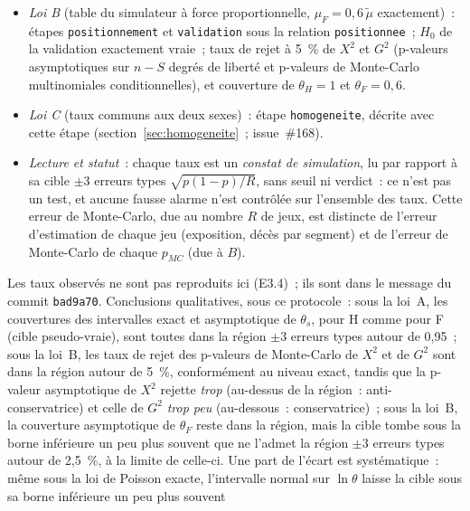 \documentclass[a4paper,11pt]{article}
\newcommand{\code}[1]{\texttt{\small #1}}
\begin{document}
\begin{itemize}[leftmargin=*, itemsep=2pt]
    modèle (la force vraie $-\ln(1 - 0{,}6\,\tilde q)$ n'est pas
    proportionnelle à $\tilde\mu$)~: la cible est la valeur
    \emph{pseudo-vraie} $\sum E^c \mu_F / \sum E^c \tilde\mu$, calculée sur
    l'exposition centrale des cellules retenues de chaque jeu.
  \item \emph{Loi B} (table du simulateur à force proportionnelle, $\mu_F =
    0{,}6\,\tilde\mu$ exactement)~: étapes \code{positionnement} et
    \code{validation} sous la relation \code{positionnee}~; $H_0$ de la
    validation exactement vraie~; taux de rejet à 5~\% de $X^2$ et $G^2$
    (p-valeurs asymptotiques sur $n - S$ degrés de liberté et p-valeurs de
    Monte-Carlo multinomiales conditionnelles), et couverture de $\theta_H
    = 1$ et $\theta_F = 0{,}6$.
  \item \emph{Loi C} (taux communs aux deux sexes)~: étape
    \code{homogeneite}, décrite avec cette étape (section~\ref{sec:homogeneite}~;
    issue~\#168).
  \item \emph{Lecture et statut}~: chaque taux est un \emph{constat de
    simulation}, lu par rapport à sa cible $\pm 3$ erreurs types
    $\sqrt{p(1 - p)/R}$, sans seuil ni verdict~: ce n'est pas un test, et
    aucune fausse alarme n'est contrôlée sur l'ensemble des taux. Cette
    erreur de Monte-Carlo, due au nombre $R$ de jeux, est distincte de
    l'erreur d'estimation de chaque jeu (exposition, décès par segment)
    et de l'erreur de Monte-Carlo de chaque $p_{MC}$ (due à $B$).
\end{itemize}
Les taux observés ne sont pas reproduits ici (E3.4)~; ils sont dans le
message du commit \code{bad9a70}. Conclusions qualitatives, sous ce
protocole~: sous la loi~A, les couvertures des intervalles exact et
asymptotique de $\theta_s$, pour H comme pour F (cible pseudo-vraie),
sont toutes dans la région $\pm 3$ erreurs types autour de 0,95~; sous la
loi~B, les taux de rejet des p-valeurs de Monte-Carlo de $X^2$ et de $G^2$
sont dans la région autour de 5~\%, conformément au niveau exact, tandis
que la p-valeur asymptotique de $X^2$ rejette \emph{trop} (au-dessus de la
région~: anti-conservatrice) et celle de $G^2$ \emph{trop peu}
(au-dessous~: conservatrice)~; sous la loi~B, la couverture asymptotique
de $\theta_F$ reste dans la région, mais la cible tombe sous la borne
inférieure un peu plus souvent que ne l'admet la région $\pm 3$ erreurs
types autour de 2,5~\%, à la limite de celle-ci. Une part de l'écart est
systématique~: même sous la loi de Poisson exacte, l'intervalle normal sur
$\ln\theta$ laisse la cible sous sa borne inférieure un peu plus souvent
\end{document}
